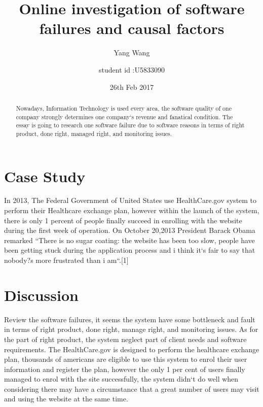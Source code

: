 \documentclass[11pt,twoside,a4paper]{article}
\begin{document}
\title{Online investigation of software failures and causal factors}

\author{Yang Wang}
\author{student id :U5833090}

\date {26th Feb 2017}

\maketitle 

\begin{abstract}

Nowadays, Information Technology is used every area, the software quality of one company strongly determines one company`s revenue and fanatical condition. The essay is going to research one software failure due to software reasons in terms of right product, done right, managed right, and monitoring issues. 
\end{abstract}

\section{Case Study}
In 2013, The Federal Government of United States use HealthCare.gov system to perform their Healthcare exchange plan, however within the launch of the system,  there is only 1 percent of people finally succeed in enrolling with the website during the first week of operation. On October 20,2013 President Barack Obama remarked ``There is no sugar coating: the website has been too slow, people have been getting stuck during the application process and i think it`s fair to say that nobody?s more frustrated than i am``.[1]


 
\section{Discussion}
Review the software failures, it seems the system have some bottleneck and fault in terms of right product, done right, manage right, and monitoring issues. 
As for the part of right product, the system neglect part of client needs and software requirements. The HealthCare.gov is designed to perform the healthcare exchange plan, thousands of americans are eligible to use this system to enrol their user information and register the plan, however the only 1 per cent of users finally managed to enrol with the site successfully, the system didn`t do well when considering there may have a circumstance that a great number of users may visit and using the website at the same time. 
\end{document}
